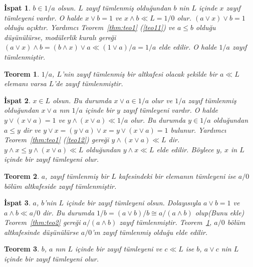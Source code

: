 \documentclass[a4paper,12pt]{article}
\numberwithin{equation}{section}
\theoremstyle{italik}
\newtheorem{teorem}{Teorem}[section]
\newtheorem*{ispat}{İspat}
\begin{document}
\begin{ispat}
 $ b \in 1/a $ olsun. $ L $ zayıf tümlenmiş olduğundan $ b $ nin $ L $ içinde $ x $ zayıf tümleyeni vardır. O halde $ x \vee b = 1 $ 
ve $ x \wedge b \ll L = 1/0 $ olur. $ ( a \vee x ) \vee b = 1 $ olduğu açıktır. Yardımcı Teorem~\ref{thm:teo1} (\ref{teo11}) ve $ a \leq b $ 
olduğu düşünülürse, modülerlik kuralı gereği $ ( a \vee x ) \wedge b = ( b \wedge x ) \vee a \ll ( 1 \vee a )/a = 1/a $ elde edilir. 
O halde $ 1/a $ zayıf tümlenmiştir.
\end{ispat}

\begin{teorem}\label{thm:teo3}
 $ 1/a $, $ L $'nin zayıf tümlenmiş bir altkafesi olacak şekilde bir $ a \ll L $ elemanı varsa $ L $'de zayıf tümlenmiştir.
\end{teorem}
\begin{ispat}
 $ x \in L $ olsun. Bu durumda $ x \vee a \in 1/a $ olur ve $ 1/a $ zayıf tümlenmiş olduğundan $ x \vee a $ nın $ 1/a $ içinde 
bir $ y $ zayıf tümleyeni vardır. O halde $ y \vee ( x \vee a ) = 1 $ ve $ y \wedge ( x \vee a ) \ll 1/a $ olur. 
Bu durumda $ y \in 1/a $ olduğundan $ a \leq y $ dir ve $ y \vee x = ( y \vee a ) \vee x = y \vee ( x \vee a ) = 1 $ bulunur. 
Yardımcı Teorem~\ref{thm:teo1} (\ref{teo12}) gereği $ y \wedge ( x \vee a ) \ll L $ dir. 
$ y \wedge x \leq y \wedge ( x \vee a ) \ll L $ olduğundan $ y \wedge x \ll L $ elde edilir. Böylece $ y $, $ x $ in $ L $ içinde 
bir zayıf tümleyeni olur. 
\end{ispat}
\begin{teorem}\label{thm:teo4}
 $ a $, zayıf tümlenmiş bir $ L $ kafesindeki bir elemanın tümleyeni ise $ a/0 $ bölüm altkafeside zayıf tümlenmiştir.
\end{teorem}
\begin{ispat}
 $ a $, $ b $'nin $ L $ içinde bir zayıf tümleyeni olsun. Dolayısıyla $ a \vee b = 1 $ ve $ a \wedge b \ll a/0 $ dir. Bu durumda 
$ 1/b = ( a \vee b ) /b \cong a / ( a \wedge b ) $ olup(Bunu ekle) Teorem~\ref{thm:teo2} gereği $ a / ( a \wedge b ) $ zayıf 
tümlenmiştir.  Teorem~\ref{thm:teo3}, $ a/0 $ bölüm altkafesinde düşünülürse $ a/0 $'ın zayıf tümlenmiş olduğu elde edilir.
\end{ispat}
\begin{teorem}
 $ b $, $ a $ nın $ L $ içinde bir zayıf tümleyeni ve $ c \ll L $ ise $ b $, $ a \vee c $ nin $ L $ içinde bir zayıf tümleyeni olur.
\end{teorem}
\end{document}
